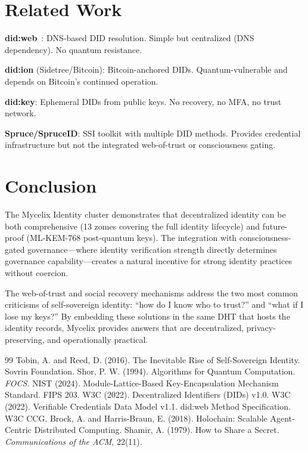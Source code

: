 \documentclass[11pt,twocolumn]{article}
\begin{document}
\section{Related Work}

\textbf{did:web}~\cite{didweb}: DNS-based DID resolution. Simple but centralized
(DNS dependency). No quantum resistance.

\textbf{did:ion} (Sidetree/Bitcoin): Bitcoin-anchored DIDs. Quantum-vulnerable
and depends on Bitcoin's continued operation.

\textbf{did:key}: Ephemeral DIDs from public keys. No recovery, no MFA, no
trust network.

\textbf{Spruce/SpruceID}: SSI toolkit with multiple DID methods. Provides
credential infrastructure but not the integrated web-of-trust or
consciousness gating.

\section{Conclusion}

The Mycelix Identity cluster demonstrates that decentralized identity can be
both comprehensive (13 zomes covering the full identity lifecycle) and
future-proof (ML-KEM-768 post-quantum keys). The integration with
consciousness-gated governance---where identity verification strength directly
determines governance capability---creates a natural incentive for strong
identity practices without coercion.

The web-of-trust and social recovery mechanisms address the two most common
criticisms of self-sovereign identity: ``how do I know who to trust?'' and
``what if I lose my keys?'' By embedding these solutions in the same DHT
that hosts the identity records, Mycelix provides answers that are
decentralized, privacy-preserving, and operationally practical.

\begin{thebibliography}{99}
   Tobin, A. and Reed, D. (2016). The Inevitable Rise of
    Self-Sovereign Identity. Sovrin Foundation.
   Shor, P. W. (1994). Algorithms for Quantum Computation.
    \textit{FOCS}.
   NIST (2024). Module-Lattice-Based Key-Encapsulation
    Mechanism Standard. FIPS 203.
   W3C (2022). Decentralized Identifiers (DIDs) v1.0.
   W3C (2022). Verifiable Credentials Data Model v1.1.
   did:web Method Specification. W3C CCG.
   Brock, A. and Harris-Braun, E. (2018). Holochain:
    Scalable Agent-Centric Distributed Computing.
   Shamir, A. (1979). How to Share a Secret.
    \textit{Communications of the ACM}, 22(11).
\end{thebibliography}
\end{document}
